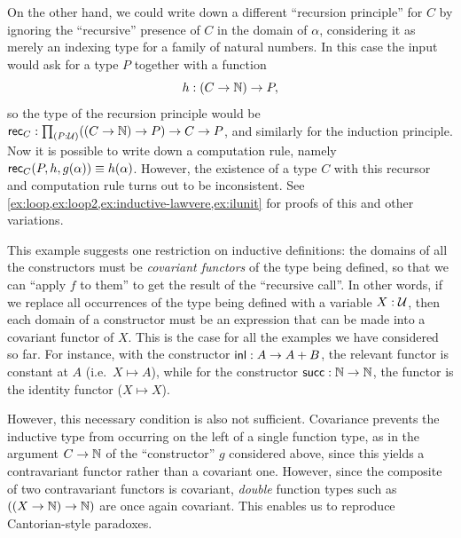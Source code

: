 On the other hand, we could write down a different ``recursion principle'' for $C$ by ignoring the ``recursive'' presence of $C$ in the domain of $\alpha$, considering it as merely an indexing type for a family of natural numbers.
In this case the input would ask for a type $P$ together with a function
\begin{equation*}
  h:(C\to \mathbb{N}) \to P,
\end{equation*}
so the type of the recursion principle would be $\rec{C}:\prd{P:\UU} ((C\to \nat) \to P) \to C\to P$, and similarly for the induction principle.
Now it is possible to write down a computation rule, namely $\mathsf{rec}_{C}(P,h,g(\alpha))\equiv h(\alpha)$.
However, the existence of a type $C$ with this recursor and computation rule turns out to be inconsistent.
See \cref{ex:loop,ex:loop2,ex:inductive-lawvere,ex:ilunit} for proofs of this and other variations.

This example suggests one restriction on inductive definitions: the domains of all the constructors must be \emph{covariant functors} of the type being defined, so that we can ``apply $f$ to them'' to get the result of the ``recursive call''.
In other words, if we replace all occurrences of the type being defined with a variable
%
$X:\mathcal{U}$, then each domain of a constructor
%
must be an expression that can be made into a covariant functor of $X$.
This is the case for all the examples we have considered so far.
For instance, with the constructor ${\mathsf{inl}}:A\to A+B$, the relevant functor is constant at $A$ (i.e.\ $X\mapsto A$), while for the constructor $\mathsf{succ}:\mathbb{N}\to\mathbb{N}$, the functor is the identity functor ($X\mapsto X$).

However, this necessary condition is also not sufficient.
Covariance prevents the inductive type from occurring on the left of a single function type, as in the argument $C\to\mathbb{N}$ of the ``constructor'' $g$ considered above, since this yields a contravariant functor rather than a covariant one.
However, since the composite of two contravariant functors is covariant, \emph{double} function types such as $((X\to \mathbb{N})\to \mathbb{N})$ are once again covariant.
This enables us to reproduce Cantorian-style paradoxes.

